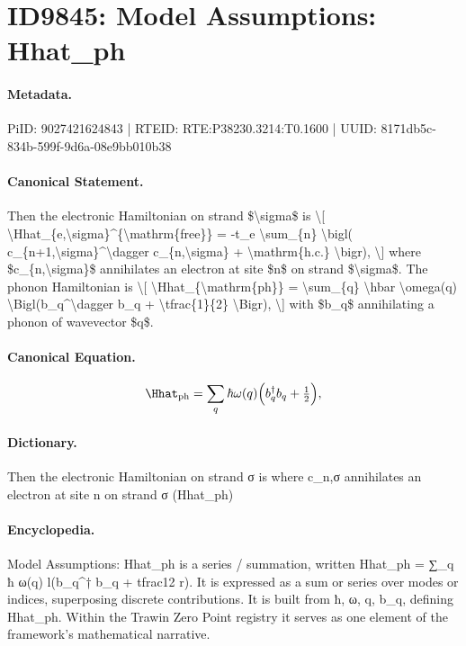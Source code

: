 \section*{ID9845: Model Assumptions: Hhat\_ph}
\paragraph{Metadata.}
PiID: 9027421624843 | RTEID: RTE:P38230.3214:T0.1600 | UUID: 8171db5c-834b-599f-9d6a-08e9bb010b38

\paragraph{Canonical Statement.}
Then the electronic Hamiltonian on strand \$\textbackslash{}sigma\$ is \textbackslash{}[ \textbackslash{}Hhat\_\{e,\textbackslash{}sigma\}\textasciicircum{}\{\textbackslash{}mathrm\{free\}\} = -t\_e \textbackslash{}sum\_\{n\} \textbackslash{}bigl( c\_\{n+1,\textbackslash{}sigma\}\textasciicircum{}\textbackslash{}dagger c\_\{n,\textbackslash{}sigma\} + \textbackslash{}mathrm\{h.c.\} \textbackslash{}bigr), \textbackslash{}] where \$c\_\{n,\textbackslash{}sigma\}\$ annihilates an electron at site \$n\$ on strand \$\textbackslash{}sigma\$. The phonon Hamiltonian is \textbackslash{}[ \textbackslash{}Hhat\_\{\textbackslash{}mathrm\{ph\}\} = \textbackslash{}sum\_\{q\} \textbackslash{}hbar \textbackslash{}omega(q) \textbackslash{}Bigl(b\_q\textasciicircum{}\textbackslash{}dagger b\_q + \textbackslash{}tfrac\{1\}\{2\} \textbackslash{}Bigr), \textbackslash{}] with \$b\_q\$ annihilating a phonon of wavevector \$q\$.

\paragraph{Canonical Equation.}
\[
\Hhat_{\mathrm{ph}} = \sum_{q} \hbar \omega(q) \Bigl(b_q^\dagger b_q + \tfrac{1}{2} \Bigr),
\]

\paragraph{Dictionary.}
Then the electronic Hamiltonian on strand σ is where c\_n,σ annihilates an electron at site n on strand σ (Hhat\_ph)

\paragraph{Encyclopedia.}
Model Assumptions: Hhat\_ph is a series / summation, written Hhat\_ph = ∑\_q ħ ω(q) l(b\_q\textasciicircum{}† b\_q + tfrac12 r). It is expressed as a sum or series over modes or indices, superposing discrete contributions. It is built from ħ, ω, q, b\_q, defining Hhat\_ph. Within the Trawin Zero Point registry it serves as one element of the framework's mathematical narrative.
